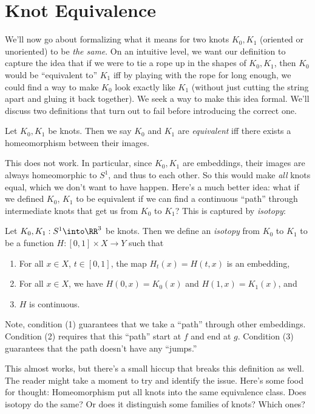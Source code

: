 \section{Knot Equivalence}\label{sec:KnotEq}
We'll now go about formalizing what it means for two knots $K_0, K_1$
(oriented or unoriented) to be \emph{the same}. On an intuitive level,
we want our definition to capture the idea that if we were to tie a
rope up in the shapes of $K_0, K_1$, then $K_0$ would be ``equivalent
to'' $K_1$ iff by playing with the rope for long enough, we could find
a way to make $K_0$ look exactly like $K_1$ (without just cutting the
string apart and gluing it back together). We seek a way to make this
idea formal. We'll discuss two definitions that turn out to fail
before introducing the correct one.
\begin{attempt}[Homeomorphism]
  Let $K_0, K_1$ be knots. Then we say $K_0$ and $K_1$ are
  \emph{equivalent} iff there exists a homeomorphism between their
  images.
\end{attempt}
This does not work. In particular, since $K_0, K_1$ are embeddings,
their images are always homeomorphic to $S^1$, and thus to each other.
So this would make \emph{all} knots equal, which we don't want to have
happen. Here's a much better idea: what if we defined $K_0$, $K_1$ to
be equivalent if we can find a continuous ``path'' through
intermediate knots that get us from $K_0$ to $K_1$? This is captured
by \emph{isotopy}:
\begin{attempt}[Isotopy]
  Let $K_0, K_1 : S^1 \into \RR^3$ be knots. Then we define an
  \emph{isotopy} from $K_0$ to $K_1$ to be a function $H : [0,1]
  \times X \to Y$ such that
  \begin{enumerate}
    \item For all $x \in X$, $t \in [0,1]$, the map $H_t(x) = H(t, x)$
      is an embedding,
    \item For all $x \in X$, we have $H( 0, x) = K_0(x)$ and
      $H(1, x) = K_1(x)$, and
    \item $H$ is continuous. \qedhere
  \end{enumerate}
\end{attempt}
Note, condition (1) guarantees that we take a ``path'' through other
embeddings. Condition (2) requires that this ``path'' start at $f$ and
end at $g$. Condition (3) guarantees that the path doesn't have any
``jumps.''

This almost works, but there's a small hiccup that breaks this
definition as well. The reader might take a moment to try and identify
the issue. Here's some food for thought: Homeomorphism put all knots
into the same equivalence class. Does isotopy do the same? Or does it
distinguish some families of knots? Which ones?


